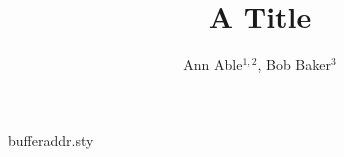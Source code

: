 \begin{filecontents*}[overwrite]{bufferaddr.sty}
\def\@aabuffer{}
\def\author #1{\expandafter\def\expandafter\@aabuffer\expandafter
{\@aabuffer \small\rm      #1\relax \par}}
\def\address#1{\expandafter\def\expandafter\@aabuffer\expandafter
{\@aabuffer \small\it #1\relax \par\vspace{0em}}}
\def\maketitle{
\begin{center}
   {\bf \@title \par}
   \vskip 1em
   \@aabuffer\relax
\end{center} \par
\gdef\@aabuffer{}
}
\end{filecontents*}
\documentclass{article}
\usepackage{bufferaddr}

\title{A Title}
\author{Ann Able$^{1,2}$, Bob Baker$^{3}$}
\address{$^1$Univ A, Town}
\address{$^2$Univ B, City}
\address{$^3$Lab C, Place}
\maketitle
Body.

